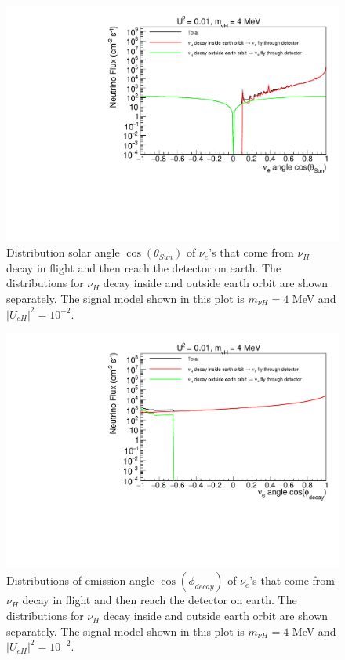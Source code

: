 \documentclass[%
 reprint,
 amsmath,amssymb,
 aps,
 prd,
floatfix,
twocolumn,
]{revtex4-1}
\begin{document}
\begin{figure}[!htbp]
\includegraphics[width=0.99\columnwidth]{../plots/DecayInFlightNuLCosthetaSun_U0.01_M4.0_InsideOutside_linXlogY.pdf}
\caption{Distribution solar angle $\cos(\theta_{Sun})$ of $\nu_e$'s that come from $\nu_H$ decay in flight and then reach the detector on earth. The distributions for $\nu_H$ decay inside and outside earth orbit are shown separately. The signal model shown in this plot is $m_{\nu H} = 4$ MeV and $|U_{eH}|^2 = 10^{-2}$.}
\label{fig:DecayInFlightTheta_U0.01_M4} 
\end{figure}


\begin{figure}[!htbp]
\includegraphics[width=0.99\columnwidth]{../plots/DecayInFlightNuLCosphiSun_U0.01_M4.0_InsideOutside_linXlogY.pdf}
\caption{Distributions of emission angle $\cos(\phi_{decay})$ of $\nu_e$'s that come from $\nu_H$ decay in flight and then reach the detector on earth. The distributions for $\nu_H$ decay inside and outside earth orbit are shown separately. The signal model shown in this plot is $m_{\nu H} = 4$ MeV and $|U_{eH}|^2 = 10^{-2}$.}
\label{fig:DecayInFlightPhi_U0.01_M4} 
\end{figure}
\end{document}
